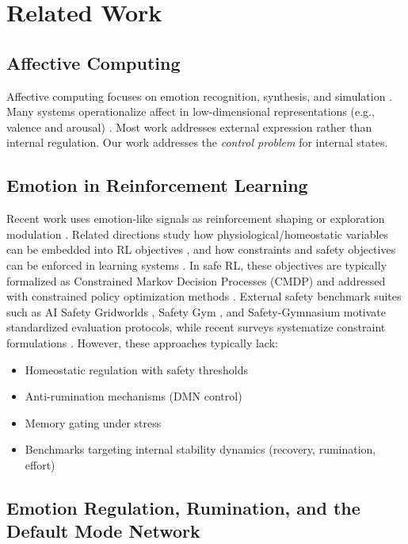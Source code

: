 \documentclass{article}
\begin{document}
\section{Related Work}

\subsection{Affective Computing}

Affective computing focuses on emotion recognition, synthesis, and simulation \cite{Picard1997, Scherer2010}. Many systems operationalize affect in low-dimensional representations (e.g., valence and arousal) \cite{Russell1980}. Most work addresses external expression rather than internal regulation. Our work addresses the \textit{control problem} for internal states.

\subsection{Emotion in Reinforcement Learning}

Recent work uses emotion-like signals as reinforcement shaping or exploration modulation \cite{Moerland2018}. Related directions study how physiological/homeostatic variables can be embedded into RL objectives \cite{Keramati2014}, and how constraints and safety objectives can be enforced in learning systems \cite{Garcia2015}. In safe RL, these objectives are typically formalized as Constrained Markov Decision Processes (CMDP) \cite{Altman1999} and addressed with constrained policy optimization methods \cite{Achiam2017}. External safety benchmark suites such as AI Safety Gridworlds \cite{Leike2017}, Safety Gym \cite{Ray2019}, and Safety-Gymnasium \cite{Ji2023} motivate standardized evaluation protocols, while recent surveys systematize constraint formulations \cite{Wachi2024}. However, these approaches typically lack:
\begin{itemize}
    \item Homeostatic regulation with safety thresholds
    \item Anti-rumination mechanisms (DMN control)
    \item Memory gating under stress
    \item Benchmarks targeting internal stability dynamics (recovery, rumination, effort)
\end{itemize}

\subsection{Emotion Regulation, Rumination, and the Default Mode Network}
\end{document}
